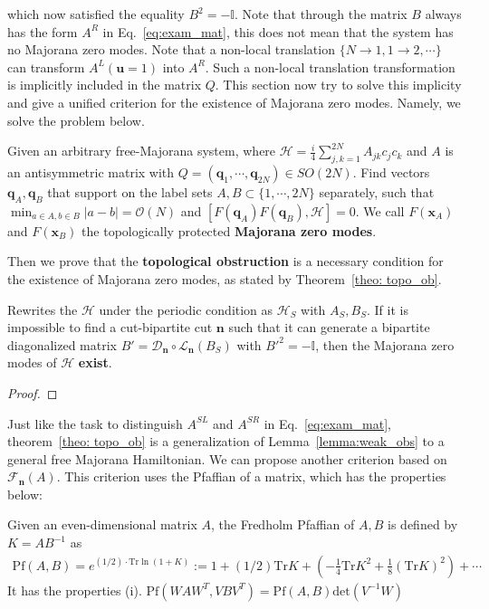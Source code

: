 which now satisfied the equality $B^2 = - \mathbb{I}$.
Note that through the matrix $B$ always has the form $A^{R}$ in Eq.~\eqref{eq:exam_mat}, this does not mean that the system has no Majorana zero modes. Note that a non-local translation $\{N \to 1, 1\to2,\cdots\}$ can transform $A^L(\mathbf{u} = 1)$ into $A^R$. Such a non-local translation transformation is implicitly included in the matrix $Q$.
This section now try to solve this implicity and give a unified criterion for the existence of Majorana zero modes. Namely, we solve the problem below.
\begin{problem}
    Given an arbitrary free-Majorana system, where $\mathcal{H} =  \frac{i}{4}\sum_{j,k = 1}^{2N}A_{jk}c_jc_k$ and $A$ is an antisymmetric matrix with  $Q = (\mathbf{q}_1,\cdots,\mathbf{q}_{2N}) \in SO(2N)$. Find vectors $\mathbf q_A,\mathbf q_B$ that support on the label sets $A, B \subset \{1,\cdots,2N\}$ separately, such that $\min_{a\in A,b\in B}|a - b| = \mathcal{O}(N)$ and  $[F(\mathbf q_A)F(\mathbf q_B),\mathcal{H}] = 0$. We call $F(\mathbf x_A)$ and $F(\mathbf x_B)$ the topologically protected \textbf{Majorana zero modes}.
\end{problem}
Then we prove that the \textbf{topological obstruction} is a necessary condition for the existence of Majorana zero modes, as stated by Theorem~\ref{theo: topo_ob}.
\begin{theorem}\label{theo: topo_ob}
   Rewrites the $\mathcal{H}$ under the periodic condition as $\mathcal{H}_S$ with $A_{S},B_S$.   If it is impossible to find a cut-bipartite cut $\mathbf{n}$ such that it can generate a bipartite diagonalized matrix $B'=\mathcal{D}_{\mathbf{n}}\circ \mathcal{L}_{\mathbf n}(B_S)$ with $B'^2 = -\mathbb{I}$,  then the Majorana zero modes of $\mathcal{H}$ \textbf{exist}.
\end{theorem}
\begin{proof}
    
\end{proof}
 Just like the task to distinguish $A^{SL}$ and $A^{SR}$ in Eq.~\eqref{eq:exam_mat}, theorem~\ref{theo: topo_ob} is a generalization of Lemma~\ref{lemma:weak_obs} to a general free Majorana Hamiltonian. We can propose another criterion based on $ \mathcal{F}_{\mathbf{n}}(A) $. This criterion uses the Pfaffian of a matrix, which has the properties below:
\begin{lemma}
    Given an even-dimensional matrix $A$, the Fredholm Pfaffian of $A,B$ is defined by $K = AB^{-1}$ as
    \begin{align}
        \text{Pf}(A,B) = e^{(1/2) \cdot \text{Tr} \ln (1 + K)} :=1 + (1/2)\text{Tr}K + \left(-\frac{1}{4} \text{Tr}K^2 + \frac{1}{8}(\text{Tr}K)^2\right) + \cdots
    \end{align}
    It has the properties (i). $\text{Pf}(WAW^T, VBV^T) = \text{Pf}(A,B)\text{det}(V^{-1}W)$
    
\end{lemma}
